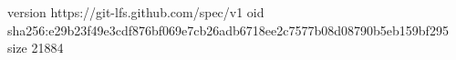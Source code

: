 version https://git-lfs.github.com/spec/v1
oid sha256:e29b23f49e3cdf876bf069e7cb26adb6718ee2c7577b08d08790b5eb159bf295
size 21884
